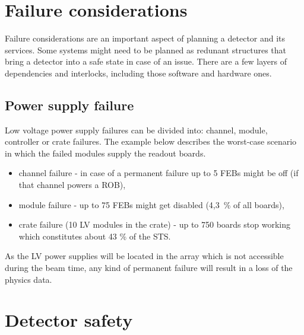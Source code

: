 \section{Failure considerations}

Failure considerations are an important aspect of planning a detector and its services. Some systems might need to be planned as redunant structures that bring a detector into a safe state in case of an issue. There are a few layers of dependencies and interlocks, including those software and hardware ones.

\subsection{Power supply failure}
Low voltage power supply failures can be divided into: channel, module, controller or crate failures. The example below describes the worst-case scenario in which the failed modules supply the readout boards.

\begin{itemize}
    \item channel failure - in case of a permanent failure up to 5 \gls{FEB}s might be off (if that channel powers a \gls{ROB}),
    \item module failure - up to 75 \gls{FEB}s might get disabled (4,3~\% of all boards), 
    \item crate failure (10 LV modules in the crate) - up to 750 boards stop working which constitutes about 43 \% of the STS.
\end{itemize}

As the LV power supplies will be located in the array which is not accessible during the beam time, any kind of permanent failure will result in a loss of the physics data. 

\section{Detector safety}
